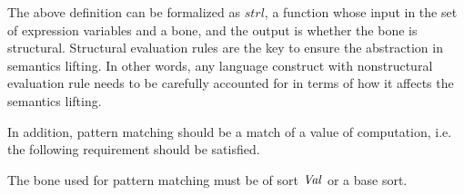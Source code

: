 The above definition can be formalized as $strl$, a function whose input in the set of expression variables and a bone, and the output is whether the bone is structural. 
 Structural evaluation rules are the key to ensure the abstraction in semantics lifting.
In other words, any language construct with nonstructural evaluation rule needs to be carefully accounted for in terms of how it affects the semantics lifting.

In addition, pattern matching should be a match of a value of computation,
 i.e. the following requirement should be satisfied.

\begin{requirement}\label{req:pat}
  The bone used for pattern matching must be of sort $\mathit{Val}$ or a base sort.
\end{requirement}

